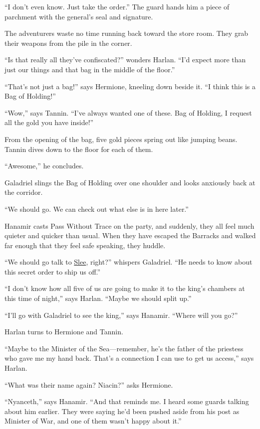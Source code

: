 \documentclass[smalldemyvopaper,11pt,twoside,onecolumn,openright,extrafontsizes]{memoir}
\begin{document}
``I don't even know. Just take the order.'' The guard hands him a piece
of parchment with the general's seal and signature.

The adventurers waste no time running back toward the store room. They
grab their weapons from the pile in the corner.

``Is that really all they've confiscated?'' wonders Harlan. ``I'd expect
more than just our things and that bag in the middle of the floor.''

``That's not just a bag!'' says Hermione, kneeling down beside it. ``I
think this is a Bag of Holding!''

``Wow,'' says Tannin. ``I've always wanted one of these. Bag of Holding,
I request all the gold you have inside!''

From the opening of the bag, five gold pieces spring out like jumping
beans. Tannin dives down to the floor for each of them.

``Awesome,'' he concludes.

Galadriel slings the Bag of Holding over one shoulder and looks
anxiously back at the corridor.

``We should go. We can check out what else is in here later.''

Hanamir casts Pass Without Trace on the party, and suddenly, they all
feel much quieter and quicker than usual. When they have escaped the
Barracks and walked far enough that they feel safe speaking, they
huddle.

``We should go talk to \href{/characters/slee/}{Slee}, right?'' whispers
Galadriel. ``He needs to know about this secret order to ship us off.''

``I don't know how all five of us are going to make it to the king's
chambers at this time of night,'' says Harlan. ``Maybe we should split
up.''

``I'll go with Galadriel to see the king,'' says Hanamir. ``Where will
you go?''

Harlan turns to Hermione and Tannin.

``Maybe to the Minister of the Sea---remember, he's the father of the
priestess who gave me my hand back. That's a connection I can use to get
us access,'' says Harlan.

``What was their name again? Niacin?'' asks Hermione.

``Nyanceth,'' says Hanamir. ``And that reminds me. I heard some guards
talking about him earlier. They were saying he'd been pushed aside from
his post as Minister of War, and one of them wasn't happy about it.''
\end{document}
